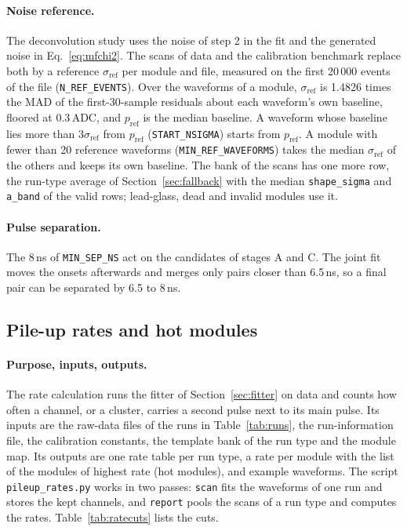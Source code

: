 \documentclass[11pt]{article}
\newcommand{\code}[1]{\texttt{#1}}
\begin{document}
\paragraph{Noise reference.} The deconvolution study uses the noise of step 2 in the fit and the generated noise in Eq.~\eqref{eq:mfchi2}. The scans of data and the calibration benchmark replace both by a reference $\sigma_{\mathrm{ref}}$ per module and file, measured on the first 20\,000 events of the file (\code{N\_REF\_EVENTS}). Over the waveforms of a module, $\sigma_{\mathrm{ref}}$ is 1.4826 times the MAD of the first-30-sample residuals about each waveform's own baseline, floored at 0.3\,ADC, and $p_{\mathrm{ref}}$ is the median baseline. A waveform whose baseline lies more than $3\sigma_{\mathrm{ref}}$ from $p_{\mathrm{ref}}$ (\code{START\_NSIGMA}) starts from $p_{\mathrm{ref}}$. A module with fewer than 20 reference waveforms (\code{MIN\_REF\_WAVEFORMS}) takes the median $\sigma_{\mathrm{ref}}$ of the others and keeps its own baseline. The bank of the scans has one more row, the run-type average of Section~\ref{sec:fallback} with the median \code{shape\_sigma} and \code{a\_band} of the valid rows; lead-glass, dead and invalid modules use it.

\paragraph{Pulse separation.} The 8\,ns of \code{MIN\_SEP\_NS} act on the candidates of stages A and C. The joint fit moves the onsets afterwards and merges only pairs closer than 6.5\,ns, so a final pair can be separated by 6.5 to 8\,ns.


\subsection{Pile-up rates and hot modules}
\label{sec:rates}

\paragraph{Purpose, inputs, outputs.} The rate calculation runs the fitter of Section~\ref{sec:fitter} on data and counts how often a channel, or a cluster, carries a second pulse next to its main pulse. Its inputs are the raw-data files of the runs in Table~\ref{tab:runs}, the run-information file, the calibration constants, the template bank of the run type and the module map. Its outputs are one rate table per run type, a rate per module with the list of the modules of highest rate (hot modules), and example waveforms. The script \code{pileup\_rates.py} works in two passes: \code{scan} fits the waveforms of one run and stores the kept channels, and \code{report} pools the scans of a run type and computes the rates. Table~\ref{tab:ratecuts} lists the cuts.
\end{document}
